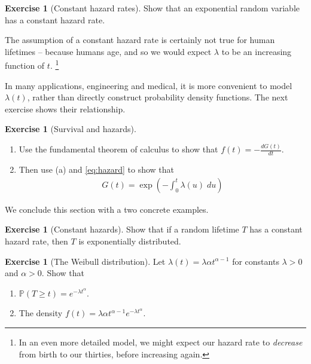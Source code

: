 \documentclass[11pt]{article}
\theoremstyle{definition}
\newtheorem{exercise}[]{Exercise}
\renewcommand{\P}{\mathbb{P}}
\begin{document}
\begin{exercise}[Constant hazard rates]
Show that an exponential random variable has a constant hazard rate.
\end{exercise}

The assumption of a constant hazard rate is certainly not true
for human lifetimes -- because humans age, and so
we would expect $\lambda$ to be an increasing function of $t$.
\footnote{In an even more detailed model, we might
expect our hazard rate to \textit{decrease} from birth to our thirties,
before increasing again. }

In many applications, engineering and medical, it is more
convenient to model
$\lambda(t)$, rather than directly construct probability density functions.
The next exercise shows their relationship.

\begin{exercise}[Survival and hazards]

$\quad$

\begin{enumerate}[label=(\alph*)]
  \item Use the fundamental theorem of calculus to show that
  $f(t) = -\frac{dG(t)}{dt}$.
  \item Then use (a) and \eqref{eq:hazard} to show that
  \begin{align*}
    G(t) = \exp\left(-\int_0^t\lambda(u)\;du\right)
  \end{align*}
\end{enumerate}

\end{exercise}


We conclude this section with a two concrete examples.
\begin{exercise}[Constant hazards]
Show that if a random lifetime $T$ has a constant hazard rate,
then $T$ is exponentially distributed.
\end{exercise}

\begin{exercise}[The Weibull distribution]
Let $\lambda(t) = \lambda \alpha t^{\alpha -1}$ for constants $\lambda > 0$
and $\alpha > 0$.
Show that
\begin{enumerate}[label = (\alph*)]
  \item $\P(T \geq t) = e^{-\lambda t^\alpha}$.
  \item The density $f(t) = \lambda \alpha t^{\alpha -1}e^{-\lambda t^\alpha}$.
\end{enumerate}
\end{exercise}
\end{document}
